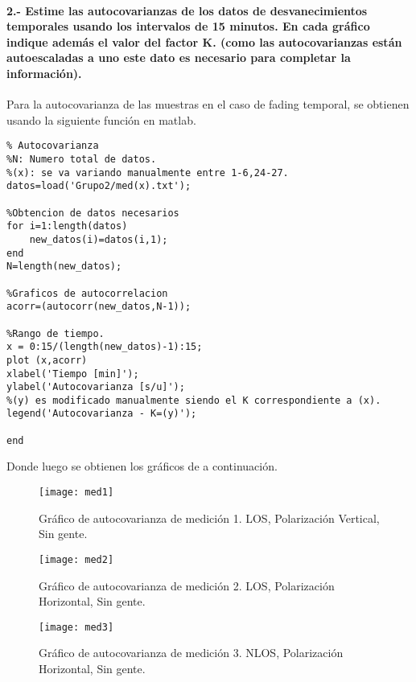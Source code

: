 \documentclass[12pt]{article}
\begin{document}
\paragraph{2.- Estime las autocovarianzas de los datos de desvanecimientos temporales usando los 
intervalos de 15 minutos. En cada gráfico indique además el valor del factor K. (como las 
autocovarianzas están autoescaladas a uno este dato es necesario para completar la información).\\}

Para la autocovarianza de las muestras en el caso de fading temporal, se obtienen usando la
siguiente función en matlab.

\small 	
\begin{verbatim}
% Autocovarianza
%N: Numero total de datos.
%(x): se va variando manualmente entre 1-6,24-27.
datos=load('Grupo2/med(x).txt'); 

%Obtencion de datos necesarios
for i=1:length(datos)
	new_datos(i)=datos(i,1);
end
N=length(new_datos); 

%Graficos de autocorrelacion
acorr=(autocorr(new_datos,N-1));

%Rango de tiempo.
x = 0:15/(length(new_datos)-1):15;
plot (x,acorr)
xlabel('Tiempo [min]');
ylabel('Autocovarianza [s/u]');
%(y) es modificado manualmente siendo el K correspondiente a (x).  
legend('Autocovarianza - K=(y)'); 

end
\end{verbatim}
\normalsize

Donde luego se obtienen los gráficos de a continuación.

\begin{figure}[H]
  \centering
        \texttt{[image: med1]}
		\caption{\footnotesize 
		Gráfico de autocovarianza de medición 1. LOS, Polarización Vertical, Sin gente.}
\label{fig:med1}
\end{figure}

\begin{figure}[H]
  \centering
        \texttt{[image: med2]}
		\caption{\footnotesize
		Gráfico de autocovarianza de medición 2. LOS, Polarización Horizontal, Sin gente.}
\label{fig:med2}
\end{figure}

\begin{figure}[H]
  \centering
        \texttt{[image: med3]}
		\caption{\footnotesize
		Gráfico de autocovarianza de medición 3. NLOS, Polarización Horizontal, Sin gente.}
\label{fig:med3}
\end{figure}
\end{document}
